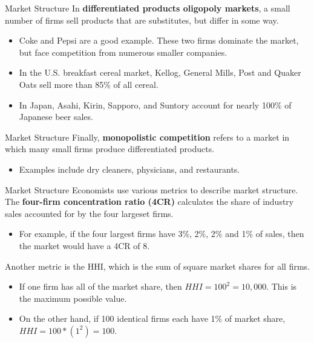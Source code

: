 \documentclass{beamer}
\begin{document}
\begin{frame}{Market Structure}
   In \textbf{differentiated products oligopoly markets}, a small number of firms sell products that are substitutes, but differ in some way.

  \begin{itemize}
    \item Coke and Pepsi are a good example. These two firms dominate the market, but face competition from numerous smaller companies.
    
    \item In the U.S. breakfast cereal market, Kellog, General Mills, Post and Quaker Oats sell more than 85\% of all cereal.
    
    \item In Japan, Asahi, Kirin, Sapporo, and Suntory account for nearly 100\% of Japanese beer sales.
  \end{itemize}
\end{frame}

\begin{frame}{Market Structure}
   Finally, \textbf{monopolistic competition} refers to a market in which many small firms produce differentiated products.

  \begin{itemize}
    \item Examples include dry cleaners, physicians, and restaurants.
  \end{itemize}
\end{frame}

\begin{frame}{Market Structure}
  Economists use various metrics to describe market structure. The \textbf{four-firm concentration ratio (4CR)} calculates the share of industry sales accounted for by the four largeset firms.

  \begin{itemize}
    \item For example, if the four largest firms have 3\%, 2\%, 2\% and 1\% of sales, then the market would have a 4CR of 8.
  \end{itemize}

  \smallskip
  Another metric is the HHI, which is the sum of square market shares for all firms.

  \begin{itemize}
    \item If one firm has all of the market share, then $HHI = 100^2 = 10,000$. This is the maximum possible value.
    
    \item On the other hand, if 100 identical firms each have 1\% of market share, $HHI = 100 * (1^2) = 100$. 
  \end{itemize}
\end{frame}
\end{document}
